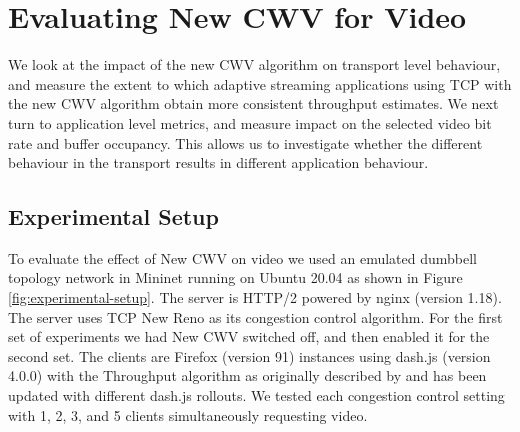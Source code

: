 \documentclass[10pt,sigconf]{acmart}
\begin{document}


\section{Evaluating New CWV for Video}
\label{sec:evaluation}

We look at the impact of the new CWV algorithm on transport level behaviour, and measure the extent to which adaptive streaming applications using TCP with the new CWV algorithm obtain more consistent throughput estimates. We next turn to application level metrics, and measure impact on the selected video bit rate and buffer occupancy. This allows us to investigate whether the different behaviour in the transport results in different application behaviour. 

\subsection{Experimental Setup}
\label{sec:experimental-setup}

To evaluate the effect of New CWV on video we used an emulated dumbbell topology network in Mininet running on Ubuntu 20.04 as shown in Figure \ref{fig:experimental-setup}.
 The server is HTTP/2 powered by nginx (version 1.18). The server uses TCP New Reno as its congestion control algorithm. For the first set of experiments we had New CWV switched off, and then enabled it for the second set.
 The clients are Firefox (version 91) instances using dash.js (version 4.0.0) with the Throughput algorithm as originally described by \cite{Spiteri-2019-from-theory-to-practice-sabre} and has been updated with different dash.js rollouts. We tested each congestion control setting with 1, 2, 3, and 5 clients simultaneously requesting video.
 
\end{document}
